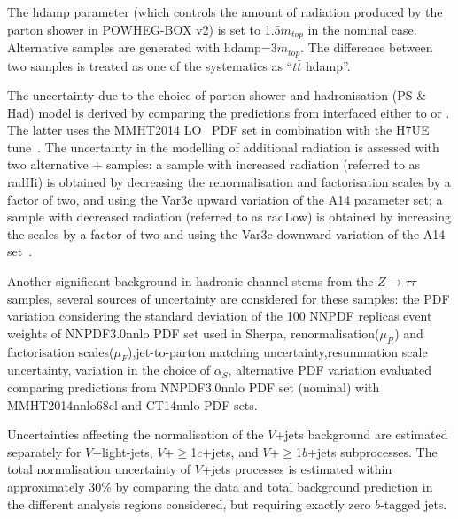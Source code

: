 The hdamp parameter (which controls the amount of radiation produced by the parton shower in
POWHEG-BOX v2) is set to 1.5$m_{top}$ in the nominal case. Alternative samples are generated with hdamp=3$m_{top}$. The
difference between two samples is treated as one of the systematics as ``$t\bar{t}$ hdamp''. 

The uncertainty due to the choice of parton shower and hadronisation (PS \& Had) model is derived 
by comparing the predictions from {\powheg} interfaced either to {\pythiaeight} or {}. 
The latter uses the MMHT2014 LO~\cite{Harland-Lang:2014zoa} PDF set in combination with the H7UE tune~\cite{Bellm:2015jjp}.
The uncertainty in the modelling of additional radiation is assessed with two alternative {\powheg}+{\pythiaeight} samples:
a sample with increased radiation (referred to as radHi) is obtained by decreasing the renormalisation and factorisation scales  
by a factor of two, %
and using the Var3c upward variation of the A14 parameter set;
a sample with decreased radiation (referred to as radLow) is obtained by increasing the scales by a factor of two 
and using the Var3c downward variation of the A14 set~\cite{ATL-PHYS-PUB-2016-004}.


Another significant background in hadronic channel stems from the $Z\rightarrow \tau\tau$ samples, several sources of uncertainty are
considered for these samples: the PDF variation considering the standard deviation of the 100 NNPDF replicas event weights of NNPDF3.0nnlo PDF
set used in Sherpa, renormalisation($\mu_{R}$) and factorisation scales($\mu_{F}$),jet-to-parton matching uncertainty,resummation scale uncertainty,
variation in the choice of $\alpha_{S}$, alternative PDF variation evaluated comparing predictions from NNPDF3.0nnlo PDF set (nominal)
with MMHT2014nnlo68cl and CT14nnlo PDF sets.

Uncertainties affecting the normalisation of the $V$+jets background are estimated separately for $V$+light-jets, $V$+$\geq$1$c$+jets,
and $V$+$\geq$1$b$+jets subprocesses. The total normalisation uncertainty of $V$+jets processes is estimated within approximately 30\% by comparing the
data and total background prediction in the different analysis regions considered, but requiring exactly zero $b$-tagged jets.

